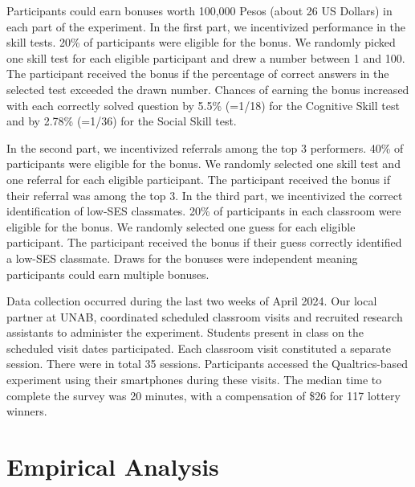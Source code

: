 \documentclass[11pt,a4paper,oneside]{article}
\begin{document}
Participants could earn bonuses worth 100,000 Pesos (about 26 US Dollars) in each part of the experiment. In the first part, we incentivized performance in the skill tests. 20\% of participants were eligible for the bonus. We randomly picked one skill test for each eligible participant and drew a number between 1 and 100. The participant received the bonus if the percentage of correct answers in the selected test exceeded the drawn number. Chances of earning the bonus increased with each correctly solved question by 5.5\% (=1/18) for the Cognitive Skill test and by 2.78\% (=1/36) for the Social Skill test. 

In the second part, we incentivized referrals among the top 3 performers. 40\% of participants were eligible for the bonus. We randomly selected one skill test and one referral for each eligible participant. The participant received the bonus if their referral was among the top 3. In the third part, we incentivized the correct identification of low-SES classmates. 20\% of participants in each classroom were eligible for the bonus. We randomly selected one guess for each eligible participant. The participant received the bonus if their guess correctly identified a low-SES classmate. Draws for the bonuses were independent meaning participants could earn multiple bonuses.   

Data collection occurred during the last two weeks of April 2024. Our local partner at UNAB, coordinated scheduled classroom visits and recruited research assistants to administer the experiment. Students present in class on the scheduled visit dates participated. Each classroom visit constituted a separate session. There were in total 35 sessions. Participants accessed the Qualtrics-based experiment using their smartphones during these visits. The median time to complete the survey was 20 minutes, with a compensation of \$26 for 117 lottery winners.

\section{Empirical Analysis} \label{s5}
\end{document}
